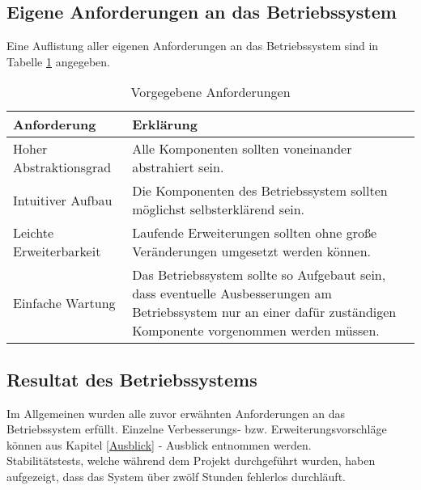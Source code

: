 \subsection{Eigene Anforderungen an das Betriebssystem}
Eine Auflistung aller eigenen Anforderungen an das Betriebssystem sind in Tabelle \ref{table:Own-Requirements} angegeben.

\begin{table}[H]
\begin{tabular}{ p{5cm}| p{9cm} }
  \textbf{Anforderung} & \textbf{Erklärung} \\ 
  \hline
  Hoher Abstraktionsgrad & Alle Komponenten sollten voneinander abstrahiert sein. \\
  Intuitiver Aufbau & Die Komponenten des Betriebssystem sollten möglichst selbsterklärend sein. \\
  Leichte Erweiterbarkeit & Laufende Erweiterungen sollten ohne große Veränderungen umgesetzt werden können. \\
  Einfache Wartung & Das Betriebssystem sollte so Aufgebaut sein, dass eventuelle Ausbesserungen am Betriebssystem nur an einer dafür zuständigen Komponente vorgenommen werden müssen. \\
 \end{tabular}
 \caption{Vorgegebene Anforderungen}
 \label{table:Own-Requirements}
\end{table}

\subsection{Resultat des Betriebssystems}
Im Allgemeinen wurden alle zuvor erwähnten Anforderungen an das Betriebssystem erfüllt. Einzelne Verbesserungs- bzw. Erweiterungsvorschläge können aus Kapitel \ref{Ausblick} - Ausblick entnommen werden. \\
Stabilitätstests, welche während dem Projekt durchgeführt wurden, haben aufgezeigt, dass das System über zwölf Stunden fehlerlos durchläuft.

\pagebreak 
